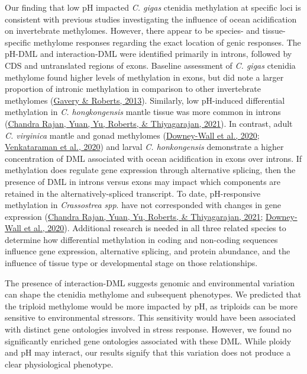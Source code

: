 \documentclass [11pt, proquest] {uwthesis}[2015/03/03]
\begin{document}
Our finding that low pH impacted \emph{C. gigas} ctenidia methylation at specific loci is consistent with previous studies investigating the influence of ocean acidification on invertebrate methylomes. However, there appear to be species- and tissue-specific methylome responses regarding the exact location of genic responses. The pH-DML and interaction-DML were identified primarily in introns, followed by CDS and untranslated regions of exons. Baseline assessment of \emph{C. gigas} ctenidia methylome found higher levels of methylation in exons, but did note a larger proportion of intronic methylation in comparison to other invertebrate methylomes (\protect\hyperlink{ref-Gavery2013}{Gavery \& Roberts, 2013}). Similarly, low pH-induced differential methylation in \emph{C. hongkongensis} mantle tissue was more common in introns (\protect\hyperlink{ref-ChandraRajan2021}{Chandra Rajan, Yuan, Yu, Roberts, \& Thiyagarajan, 2021}). In contrast, adult \emph{C. virginica} mantle and gonad methylomes (\protect\hyperlink{ref-Downey-Wall2020}{Downey-Wall et al., 2020}; \protect\hyperlink{ref-Venkataraman2020}{Venkataraman et al., 2020}) and larval \emph{C. honkongensis} demonstrate a higher concentration of DML associated with ocean acidification in exons over introns. If methylation does regulate gene expression through alternative splicing, then the presence of DML in introns versus exons may impact which components are retained in the alternatively-spliced transcript. To date, pH-responsive methylation in \emph{Crassostrea spp}. have not corresponded with changes in gene expression (\protect\hyperlink{ref-ChandraRajan2021}{Chandra Rajan, Yuan, Yu, Roberts, \& Thiyagarajan, 2021}; \protect\hyperlink{ref-Downey-Wall2020}{Downey-Wall et al., 2020}). Additional research is needed in all three related species to determine how differential methylation in coding and non-coding sequences influence gene expression, alternative splicing, and protein abundance, and the influence of tissue type or developmental stage on those relationships.

The presence of interaction-DML suggests genomic and environmental variation can shape the ctenidia methylome and subsequent phenotypes. We predicted that the triploid methylome would be more impacted by pH, as triploids can be more sensitive to environmental stressors. This sensitivity would have been associated with distinct gene ontologies involved in stress response. However, we found no significantly enriched gene ontologies associated with these DML. While ploidy and pH may interact, our results signify that this variation does not produce a clear physiological phenotype.
\end{document}
